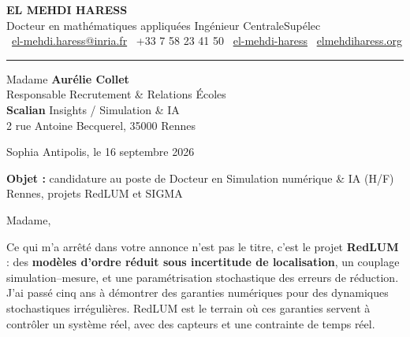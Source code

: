 \documentclass[10pt,a4paper]{article}
\begin{document}
{\headingfont\bfseries\fontsize{20}{23}\selectfont EL MEHDI HARESS}\\[0.7ex]
{\headingfont\fontsize{10.5}{13}\selectfont\color{accent}%
Docteur en mathématiques appliquées \textbar{} Ingénieur CentraleSupélec}\\[1.0ex]
{\small
\faEnvelope[regular]~\href{mailto:el-mehdi.haress@inria.fr}{el-mehdi.haress@inria.fr}\quad
\faPhone*~+33 7 58 23 41 50\quad
\faLinkedin~\href{https://www.linkedin.com/in/el-mehdi-haress-67750b3aa/}{el-mehdi-haress}\quad
\faGlobe~\href{https://elmehdiharess.org}{elmehdiharess.org}
}

\vspace{0.4ex}
{\color{rulegray}\rule{\linewidth}{0.7pt}}

\vspace{1.1ex}

\begin{minipage}[t]{0.52\textwidth}
\vspace{0pt}\raggedright\small
Madame \textbf{Aurélie Collet}\\
Responsable Recrutement \& Relations Écoles\\
\textbf{Scalian} \textemdash{} Insights / Simulation \& IA\\
2 rue Antoine Becquerel, 35000 Rennes
\end{minipage}\hfill
\begin{minipage}[t]{0.42\textwidth}
\vspace{0pt}\raggedleft\small
Sophia Antipolis, le 16 septembre 2026
\end{minipage}

\vspace{1.8ex}

{\small\textbf{Objet :} candidature au poste de Docteur en Simulation numérique \& IA (H/F) \textemdash{} Rennes,
projets RedLUM et SIGMA}

\vspace{1.6ex}

Madame,

Ce qui m'a arrêté dans votre annonce n'est pas le titre, c'est le projet \textbf{RedLUM} : des
\textbf{modèles d'ordre réduit sous incertitude de localisation}, un couplage simulation--mesure, et une
paramétrisation stochastique des erreurs de réduction. J'ai passé cinq ans à démontrer des garanties
numériques pour des dynamiques stochastiques irrégulières. RedLUM est le terrain où ces garanties servent à
contrôler un système réel, avec des capteurs et une contrainte de temps réel.
\end{document}
